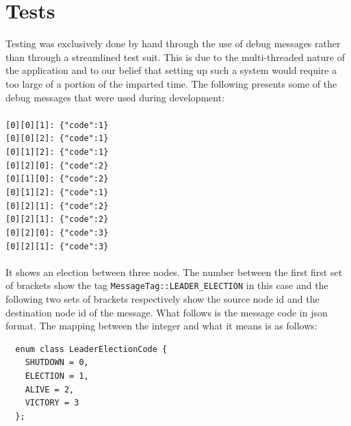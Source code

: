 \documentclass[11pt]{article}
\begin{document}
\section{Tests}
Testing was exclusively done by hand through the use of debug messages rather
than through a streamlined test suit. This is due to the multi-threaded nature of
the application and to our belief that setting up such a system would require a
too large of a portion of the imparted time. The following presents some of the
debug messages that were used during development:\\\\
\texttt{[0][0][1]: \{"code":1\}}\\
\texttt{[0][0][2]: \{"code":1\}}\\
\texttt{[0][1][2]: \{"code":1\}}\\
\texttt{[0][2][0]: \{"code":2\}}\\
\texttt{[0][1][0]: \{"code":2\}}\\
\texttt{[0][1][2]: \{"code":1\}}\\
\texttt{[0][2][1]: \{"code":2\}}\\
\texttt{[0][2][1]: \{"code":2\}}\\
\texttt{[0][2][0]: \{"code":3\}}\\
\texttt{[0][2][1]: \{"code":3\}}\\\\
It shows an election between three nodes. The number between the first first set
of brackets show the tag \texttt{MessageTag::LEADER\_ELECTION} in this case and
the following two sets of brackets respectively show the source node id and the
destination node id of the message. What follows is the message code in json
format. The mapping between the integer and what it means is as follows:
\begin{verbatim}
  enum class LeaderElectionCode {
    SHUTDOWN = 0,
    ELECTION = 1,
    ALIVE = 2,
    VICTORY = 3
  };
\end{verbatim}
\end{document}
